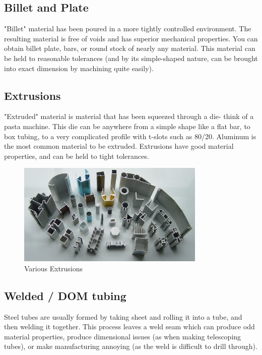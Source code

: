 \documentclass[10pt,letterpaper]{book}
\begin{document}
 \subsection{Billet and Plate}
 "Billet" material has been poured in a more tightly controlled environment. The resulting material is free of voids and has superior mechanical properties. You can obtain billet plate, bars, or round stock of nearly any material. This material can be held to reasonable tolerances (and by its simple-shaped nature, can be brought into exact dimension by machining quite easily).
 
 \subsection{Extrusions}
 "Extruded" material is material that has been squeezed through a die- think of a pasta machine. This die can be anywhere from a simple shape like a flat bar, to box tubing, to a very complicated profile with t-slots such as 80/20. Aluminum is the most common material to be extruded. Extrusions have good material properties, and can be held to tight tolerances.
 
  \begin{figure}[H]
	\centering
	\includegraphics[width=0.8\textwidth]{imgs/extrusions.jpeg}
	
	\caption{Various Extrusions}
\end{figure}
 
 \subsection{Welded / DOM tubing}
 Steel tubes are usually formed by taking sheet and rolling it into a tube, and then welding it together. This process leaves a weld seam which can produce odd material properties, produce dimensional issues (as when making telescoping tubes), or make manufacturing annoying (as the weld is difficult to drill through). 
 
\end{document}
